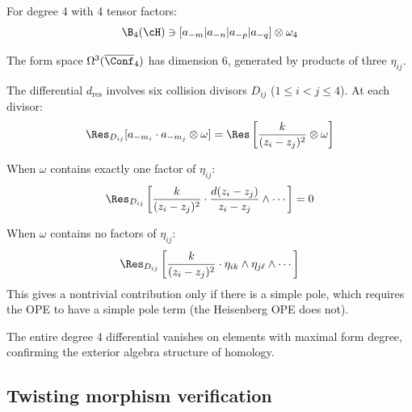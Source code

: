 \begin{computation}\label{comp:heisenberg-deg4}
For degree 4 with 4 tensor factors:
\[
\B_4(\cH) \ni [a_{-m}|a_{-n}|a_{-p}|a_{-q}] \otimes \omega_4
\]

The form space $\Omega^3(\overline{\Conf}_4)$ has dimension 6, generated by 
products of three $\eta_{ij}$.

The differential $d_{\text{res}}$ involves six collision divisors $D_{ij}$ 
($1 \leq i < j \leq 4$). At each divisor:
\[
\Res_{D_{ij}}[a_{-m_i} \cdot a_{-m_j} \otimes \omega] = \Res\left[\frac{k}{(z_i-z_j)^2} \otimes \omega\right]
\]

When $\omega$ contains exactly one factor of $\eta_{ij}$:
\[
\Res_{D_{ij}}\left[\frac{k}{(z_i-z_j)^2} \cdot \frac{d(z_i-z_j)}{z_i-z_j} \wedge \cdots\right] = 0
\]

When $\omega$ contains no factors of $\eta_{ij}$:
\[
\Res_{D_{ij}}\left[\frac{k}{(z_i-z_j)^2} \cdot \eta_{ik} \wedge \eta_{j\ell} \wedge \cdots\right]
\]
This gives a nontrivial contribution only if there is a simple pole, which requires 
the OPE to have a simple pole term (the Heisenberg OPE does not).

The entire degree 4 differential vanishes on elements with
maximal form degree, confirming the exterior algebra structure of homology.
\end{computation}


\subsection{Twisting morphism verification}

